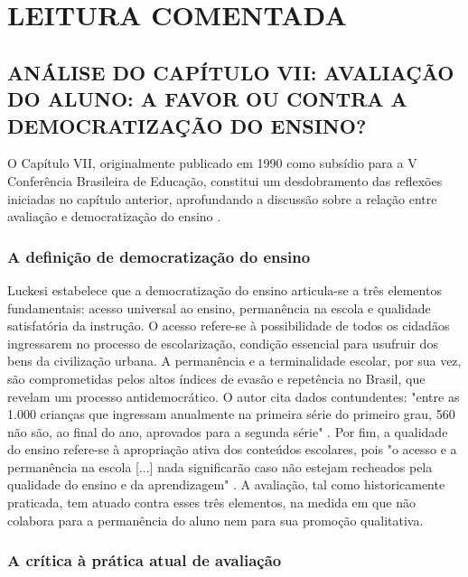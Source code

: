 
\chapter{LEITURA COMENTADA}
\label{chap:desenvolvimento}

\section{ANÁLISE DO CAPÍTULO VII: AVALIAÇÃO DO ALUNO: A FAVOR OU CONTRA A DEMOCRATIZAÇÃO DO ENSINO?}

O Capítulo VII, originalmente publicado em 1990 como subsídio para a V Conferência Brasileira de Educação, constitui um desdobramento das reflexões iniciadas no capítulo anterior, aprofundando a discussão sobre a relação entre avaliação e democratização do ensino \cite{luckesi-avaprend}.

\subsection{A definição de democratização do ensino}

Luckesi estabelece que a democratização do ensino articula-se a três elementos fundamentais: acesso universal ao ensino, permanência na escola e qualidade satisfatória da instrução. O acesso refere-se à possibilidade de todos os cidadãos ingressarem no processo de escolarização, condição essencial para usufruir dos bens da civilização urbana. A permanência e a terminalidade escolar, por sua vez, são comprometidas pelos altos índices de evasão e repetência no Brasil, que revelam um processo antidemocrático. O autor cita dados contundentes: "entre as 1.000 crianças que ingressam anualmente na primeira série do primeiro grau, 560 não são, ao final do ano, aprovados para a segunda série" \cite{luckesi-avaprend}. Por fim, a qualidade do ensino refere-se à apropriação ativa dos conteúdos escolares, pois "o acesso e a permanência na escola [...] nada significarão caso não estejam recheados pela qualidade do ensino e da aprendizagem" \cite{luckesi-avaprend}. A avaliação, tal como historicamente praticada, tem atuado contra esses três elementos, na medida em que não colabora para a permanência do aluno nem para sua promoção qualitativa.

\subsection{A crítica à prática atual de avaliação}

